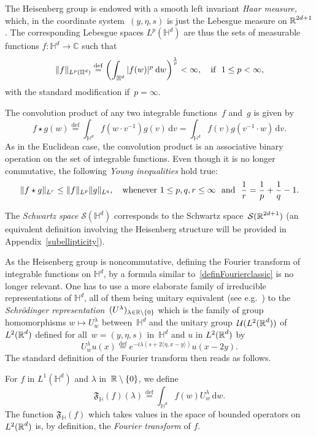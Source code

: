 \documentclass[AHL,Unicode,longabstracts]{cedram}
\def\R{{\mathop{\mathbb R\kern 0pt}\nolimits}}
\newcommand*\bbH{\mathbb{H}}
\newcommand{\lam}{\lambda}
\newcommand*\cS{\mathcal{S}}
\newcommand*\cU{\mathcal{U}}
\newcommand*\fF{\mathfrak{F}}
\newcommand*\bbC{\mathbb{C}}
\newcommand*\R{\mathbb{R}}
\newcommand*\bbH{\mathbb{H}}
\newcommand\norm[2]{\|#1\|_{#2}}
\newcommand*\eqdefa{\overset{\mathrm{def}}{=}}
\newcommand*{\dd}{\mathrm{d}}
\newcommand{\dv}{\dd v}
\newcommand{\dw}{\dd w}
\begin{document}
The Heisenberg group is endowed with a smooth left invariant \emph{Haar measure,} which, in the coordinate system~$(y, \eta, s)$ is just the Lebesgue measure on $\R^{2d+1}$. The corresponding Lebesgue spaces $L^p (\bbH^d)$ are thus the sets of measurable functions $f:\bbH^d\to\bbC$ such that
\[
\|f\|_{L^p (\bbH^d)} \eqdefa \left(\int_{\bbH^d} |f(w)|^p \: \dw \right)^\frac1p<\infty, \quad\hbox{if }\ 1\leq p<\infty,
\]
with the standard modification if~$p=\infty$.

The convolution product of any two integrable functions~$f$ and~$g$ is given by
\[
f \star g (w) \eqdefa \int_{\bbH^d} f (w \cdot v^{-1}) g(v)\, \dv = \int_{\bbH^d} f (v) g(v^{-1} \cdot w)\, \dv.
\]
As in the Euclidean case, the convolution product is an associative binary operation on the set of integrable functions. Even though it is no longer commutative, the following \emph{Young inequalities} hold true:
\[
\norm{ f \star g }{L^r} \leq \norm f {L^p} \norm g {L^q},
\quad \hbox{whenever}\ 1\leq p,q,r\leq\infty\ \hbox{ and }\
\frac{1}{r} = \frac{1}{p} + \frac{1}{q} - 1.
\]

The \emph{Schwartz space} $\cS(\bbH^d)$ corresponds to the Schwartz space~$\cS(\R^{2d+1})$ (an equivalent definition involving the Heisenberg structure will be provided in Appendix~\ref{subellipticity}).

As the Heisenberg group is noncommutative, defining the Fourier transform of integrable functions on $\bbH^d$, by a formula similar to~\eqref{definFourierclassic} is no longer relevant. One has to use a more elaborate family of irreducible representations of $\bbH^d$, all of them being unitary equivalent (see e.g.~\cite[Chapter~2]{taylor1}) to the \emph{Schr\"odinger representation}~$(U^\lam)_{\lambda\in\R\setminus\{0\}}$ which is the family of group homomorphisms $w\mapsto U^\lam_w$ between~$\bbH^d$ and the unitary group~$\cU(L^2(\R^d))$ of~$L^2(\R^d)$ defined for all~$w=(y,\eta, s)$ in~$\bbH^d$ and $u$ in $L^2(\R^d)$ by
\[
U^\lam _w u(x)\eqdefa e^{-i\lam (s+2\langle \eta, x-y\rangle)} u(x-2y).
\]
The standard definition of the Fourier transform then reads as follows.

\begin{defi}\label{definFourierSchrodinger}
For $f$ in $L^1(\bbH^d)$ and $\lam$ in~$ \R\setminus\{0\}$, we define
\[
\fF_{\bbH} (f)(\lam) \eqdefa \int_{\bbH^d} f(w) U^\lam_w\, \dw.
\]
The function $\fF_{\bbH} (f)$ which takes values in the space of bounded operators on $L^2(\R^d)$ is, by definition, the \emph{ Fourier transform}  of $f$.
\end{defi}
\end{document}
